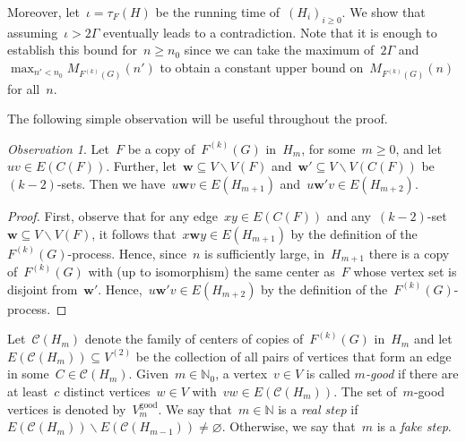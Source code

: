 \documentclass[oneside, 12pt]{amsart}
\numberwithin{equation}{section}
\numberwithin{figure}{section}
\let\emptyset=\varnothing
\let\setminus=\smallsetminus
\newcommand{\cC}{\mathcal{C}}
\theoremstyle{plain}
\theoremstyle{note}
\theoremstyle{remark}
\newtheorem{observation}[theorem]{Observation}
\begin{document}
	Moreover, let~$\iota=\tau_F(H)$ be the running time of~$(H_i)_{i\geq 0}$.
    We show that assuming~$\iota>2\Gamma$ eventually leads to a contradiction.
    Note that it is enough to establish this bound for~$n\geq n_0$ since we can take the maximum of~$2\Gamma$ and~$\max_{n'< n_0}M_{F^{(k)}(G)}(n')$ to obtain a constant upper bound on~$M_{F^{(k)}(G)}(n)$ for all~$n$.
    
	The following simple observation will be useful throughout the proof.
	
	\begin{observation}\label{obs:almostfulldegree}
		Let~$F$ be a copy of~$F^{(k)}(G)$ in~$H_m$, for some~$m \geq 0$, and let~$uv \in E(C(F))$.
        Further, let~$\mathbf{w} \subseteq V \setminus V(F)$ and~$\mathbf{w}' \subseteq V \setminus V(C(F))$ be~$(k-2)$-sets.
        Then we have~$u\mathbf{w}v\in E(H_{m+1})$ and~$u\mathbf{w}'v\in E(H_{m+2})$.
	\end{observation}
	
	\begin{proof}
		
		First, observe that for any edge~$xy \in E(C(F))$ and any~$(k-2)$-set~$\mathbf{w} \subseteq V \setminus V(F)$, it follows that~$x\mathbf{w}y\in E(H_{m+1})$ by the definition of the~$F^{(k)}(G)$-process.
		Hence, since~$n$ is sufficiently large, in~$H_{m+1}$ there is a copy of~$F^{(k)}(G)$ with (up to isomorphism) the same center as~$F$ whose vertex set is disjoint from~$\mathbf{w'}$.
		Hence,~$u\mathbf{w'}v \in E(H_{m+2})$ by the definition of the~$F^{(k)}(G)$-process.
	\end{proof}

    Let~$\cC(H_m)$ denote the family of centers of copies of~$F^{(k)}(G)$ in~$H_m$ and let~$E(\cC(H_m))\subseteq V^{(2)}$ be the collection of all pairs of vertices that form an edge in some~$C\in\cC(H_m)$.
	Given~$m\in\mathds{N}_0$, a vertex~$v \in V$ is called \emph{$m$-good} 
	if there are at least~$c$ distinct vertices~$w\in V$ with~$vw\in E(\cC(H_m))$.
	The set of~$m$-good vertices is denoted by~$V_m^{\text{good}}$.
	We say that~$m\in\mathds{N}$ is a \emph{real step} if~$E(\cC(H_m))\setminus E(\cC(H_{m-1}))\neq\emptyset$.
	Otherwise, we say that~$m$ is a \emph{fake step}.
	
\end{document}
